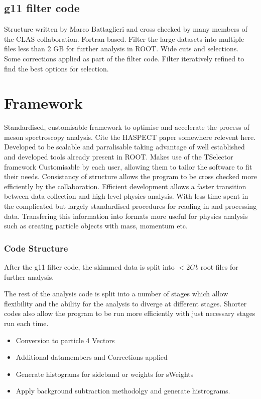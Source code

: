 \subsection{g11 filter code}
Structure written by Marco Battaglieri and cross checked by many members of the CLAS collaboration. 
Fortran based.
Filter the large datasets into multiple files less than 2 GB for further analysis in ROOT.
Wide cuts and selections.
Some corrections applied as part of the filter code.
Filter iteratively refined to find the best options for selection.

\section{Framework}
Standardised, customisable framework to optimise and accelerate the process of meson spectroscopy analysis. Cite the HASPECT paper somewhere relevent here.
Developed to be scalable and parralisable taking advantage of well established and developed tools already present in ROOT.
Makes use of the TSelector framework
Customisable by each user, allowing them to tailor the software to fit their needs.
Consistancy of structure allows the program to be cross checked more efficiently by the collaboration.
Efficient development allows a faster transition between data collection and high level physics analysis. With less time spent in the complicated but largely standardised procedures for reading in and processing data. Transfering this information into formats more useful for physics analysis such as creating particle objects with mass, momentum etc.

\subsubsection{Code Structure}

After the g11 filter code, the skimmed data is split into $<2Gb$ root files for further analysis. 

The rest of the analysis code is split into a number of stages which allow flexibility and the ability for the analysis to diverge at different stages. Shorter codes also allow the program to be run more efficiently with just necessary stages run each time.

\begin{itemize}
	\item	Conversion to particle 4 Vectors
	\item   Additional datamembers and Corrections applied
	\item   Generate histograms for sideband or weights for sWeights
	\item	Apply background subtraction methodolgy and generate histrograms. 
\end{itemize}



